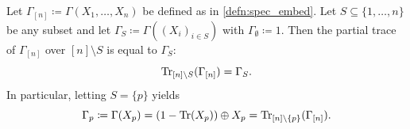 \documentclass[notitlepage, 10pt]{article}
\begin{document}
\begin{lem}
    \label{lem:partial_sum_embed}
    Let $\Gamma_{[n]} \coloneqq \Gamma(X_1, \ldots, X_n)$ be defined as in \cref{defn:spec_embed}.
    Let $S \subseteq \{1, \ldots, n\}$ be any subset and let $\Gamma_{S} \coloneqq \Gamma( (X_i)_{i \in S})$ with $\Gamma_{\emptyset} \coloneqq 1$.
    Then the partial trace of $\Gamma_{[n]}$ over $[n]\setminus S$ is equal to $\Gamma_{S}$:
    \begin{equation}
        \operatorname{Tr}_{[n]\setminus S} (\Gamma_{[n]}) = \Gamma_{S}.
    \end{equation}
    In particular, letting $S = \{p\}$ yields 
    \begin{equation}
        \Gamma_{p} \coloneqq \Gamma(X_p) = (1-\operatorname{Tr}(X_p)) \oplus X_p = \operatorname{Tr}_{[n] \setminus \{p\}}(\Gamma_{[n]}).
    \end{equation}
\end{lem}
\end{document}
